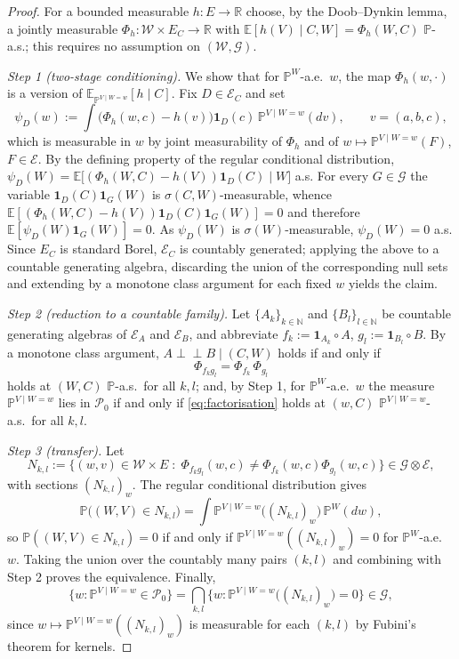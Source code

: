 \documentclass[10pt,a4paper]{amsart}
\newcommand{\indep}{\perp \!\!\! \perp}
\begin{document}
\begin{proof}
For a bounded measurable $h:E\to\mathbb{R}$ choose, by the Doob--Dynkin lemma, a
jointly measurable $\Phi_h:\mathcal{W}\times E_C\to\mathbb{R}$ with
$\mathbb{E}[h(V)\mid C,W]=\Phi_h(W,C)$ $\mathbb{P}$-a.s.; this requires no
assumption on $(\mathcal{W},\mathcal{G})$.

\emph{Step 1 (two-stage conditioning).} We show that for
$\mathbb{P}^W$-a.e.\ $w$, the map $\Phi_h(w,\cdot)$ is a version of
$\mathbb{E}_{\mathbb{P}^{V\mid W=w}}[h\mid C]$. Fix $D\in\mathcal{E}_C$ and set
\[
  \psi_D(w) := \int \bigl(\Phi_h(w,c)-h(v)\bigr)\mathbf{1}_D(c)\,
  \mathbb{P}^{V\mid W=w}(dv), \qquad v=(a,b,c),
\]
which is measurable in $w$ by joint measurability of $\Phi_h$ and of
$w\mapsto\mathbb{P}^{V\mid W=w}(F)$, $F\in\mathcal{E}$. By the defining property
of the regular conditional distribution,
$\psi_D(W)=\mathbb{E}\bigl[(\Phi_h(W,C)-h(V))\mathbf{1}_D(C)\mid W\bigr]$ a.s.
For every $G\in\mathcal{G}$ the variable $\mathbf{1}_D(C)\mathbf{1}_G(W)$ is
$\sigma(C,W)$-measurable, whence
$\mathbb{E}[(\Phi_h(W,C)-h(V))\mathbf{1}_D(C)\mathbf{1}_G(W)]=0$ and therefore
$\mathbb{E}[\psi_D(W)\mathbf{1}_G(W)]=0$. As $\psi_D(W)$ is
$\sigma(W)$-measurable, $\psi_D(W)=0$ a.s. Since $E_C$ is standard Borel,
$\mathcal{E}_C$ is countably generated; applying the above to a countable
generating algebra, discarding the union of the corresponding null sets and
extending by a monotone class argument for each fixed $w$ yields the claim.

\emph{Step 2 (reduction to a countable family).} Let $\{A_k\}_{k\in\mathbb{N}}$
and $\{B_l\}_{l\in\mathbb{N}}$ be countable generating algebras of
$\mathcal{E}_A$ and $\mathcal{E}_B$, and abbreviate
$f_k := \mathbf{1}_{A_k}\circ A$, $g_l := \mathbf{1}_{B_l}\circ B$. By a monotone
class argument, $A\indep B\mid(C,W)$ holds if and only if
\begin{equation}\label{eq:factorisation}
  \Phi_{f_kg_l} = \Phi_{f_k}\,\Phi_{g_l}
\end{equation}
holds at $(W,C)$ $\mathbb{P}$-a.s.\ for all $k,l$; and, by Step 1, for
$\mathbb{P}^W$-a.e.\ $w$ the measure $\mathbb{P}^{V\mid W=w}$ lies in
$\mathcal{P}_0$ if and only if \eqref{eq:factorisation} holds at $(w,C)$
$\mathbb{P}^{V\mid W=w}$-a.s.\ for all $k,l$.

\emph{Step 3 (transfer).} Let
\[
  N_{k,l} := \bigl\{(w,v)\in\mathcal{W}\times E \;:\;
  \Phi_{f_kg_l}(w,c) \neq \Phi_{f_k}(w,c)\Phi_{g_l}(w,c) \bigr\}
  \in \mathcal{G}\otimes\mathcal{E},
\]
with sections $(N_{k,l})_w$. The regular conditional distribution gives
\[
  \mathbb{P}\bigl((W,V)\in N_{k,l}\bigr)
  = \int \mathbb{P}^{V\mid W=w}\bigl((N_{k,l})_w\bigr)\,\mathbb{P}^W(dw),
\]
so $\mathbb{P}((W,V)\in N_{k,l})=0$ if and only if
$\mathbb{P}^{V\mid W=w}((N_{k,l})_w)=0$ for $\mathbb{P}^W$-a.e.\ $w$. Taking the
union over the countably many pairs $(k,l)$ and combining with Step 2 proves the
equivalence. Finally,
\[
  \bigl\{w:\mathbb{P}^{V\mid W=w}\in\mathcal{P}_0\bigr\}
  = \bigcap_{k,l}\bigl\{w: \mathbb{P}^{V\mid W=w}\bigl((N_{k,l})_w\bigr)=0\bigr\}
  \in\mathcal{G},
\]
since $w\mapsto\mathbb{P}^{V\mid W=w}((N_{k,l})_w)$ is measurable for each
$(k,l)$ by Fubini's theorem for kernels.
\end{proof}
\end{document}
